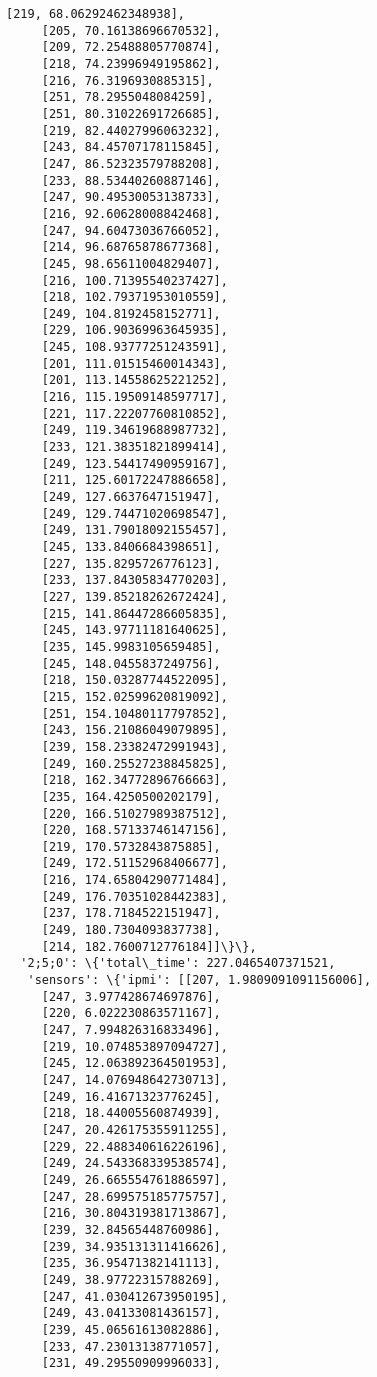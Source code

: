 \documentclass[11pt]{article}
\begin{document}
\begin{tcolorbox}[breakable, size=fbox, boxrule=.5pt, pad at break*=1mm, opacityfill=0]
\begin{Verbatim}[commandchars=\\\{\}]
     [219, 68.06292462348938],
     [205, 70.16138696670532],
     [209, 72.25488805770874],
     [218, 74.23996949195862],
     [216, 76.3196930885315],
     [251, 78.2955048084259],
     [251, 80.31022691726685],
     [219, 82.44027996063232],
     [243, 84.45707178115845],
     [247, 86.52323579788208],
     [233, 88.53440260887146],
     [247, 90.49530053138733],
     [216, 92.60628008842468],
     [247, 94.60473036766052],
     [214, 96.68765878677368],
     [245, 98.65611004829407],
     [216, 100.71395540237427],
     [218, 102.79371953010559],
     [249, 104.8192458152771],
     [229, 106.90369963645935],
     [245, 108.93777251243591],
     [201, 111.01515460014343],
     [201, 113.14558625221252],
     [216, 115.19509148597717],
     [221, 117.22207760810852],
     [249, 119.34619688987732],
     [233, 121.38351821899414],
     [249, 123.54417490959167],
     [211, 125.60172247886658],
     [249, 127.6637647151947],
     [249, 129.74471020698547],
     [249, 131.79018092155457],
     [245, 133.8406684398651],
     [227, 135.8295726776123],
     [233, 137.84305834770203],
     [227, 139.85218262672424],
     [215, 141.86447286605835],
     [245, 143.97711181640625],
     [235, 145.9983105659485],
     [245, 148.0455837249756],
     [218, 150.03287744522095],
     [215, 152.02599620819092],
     [251, 154.10480117797852],
     [243, 156.21086049079895],
     [239, 158.23382472991943],
     [249, 160.25527238845825],
     [218, 162.34772896766663],
     [235, 164.4250500202179],
     [220, 166.51027989387512],
     [220, 168.57133746147156],
     [219, 170.5732843875885],
     [249, 172.51152968406677],
     [216, 174.65804290771484],
     [249, 176.70351028442383],
     [237, 178.7184522151947],
     [249, 180.7304093837738],
     [214, 182.7600712776184]]\}\},
  '2;5;0': \{'total\_time': 227.0465407371521,
   'sensors': \{'ipmi': [[207, 1.9809091091156006],
     [247, 3.977428674697876],
     [220, 6.022230863571167],
     [247, 7.994826316833496],
     [219, 10.074853897094727],
     [245, 12.063892364501953],
     [247, 14.076948642730713],
     [249, 16.41671323776245],
     [218, 18.44005560874939],
     [247, 20.426175355911255],
     [229, 22.488340616226196],
     [249, 24.543368339538574],
     [249, 26.665554761886597],
     [247, 28.699575185775757],
     [216, 30.804319381713867],
     [239, 32.84565448760986],
     [239, 34.935131311416626],
     [235, 36.95471382141113],
     [249, 38.97722315788269],
     [247, 41.030412673950195],
     [249, 43.04133081436157],
     [239, 45.06561613082886],
     [233, 47.23013138771057],
     [231, 49.29550909996033],

\end{Verbatim}
\end{tcolorbox}
\end{document}
